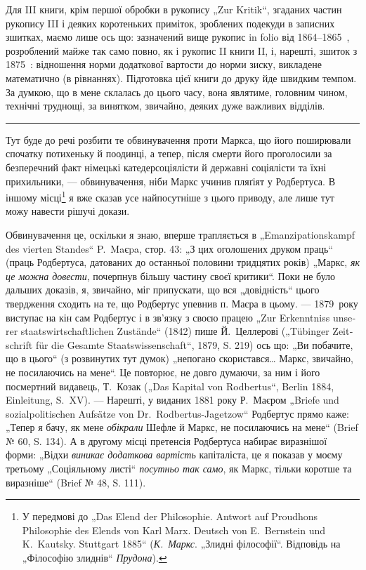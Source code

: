 Для III книги, крім першої обробки в рукопису „Zur Kritik“, згаданих
частин рукопису III і деяких коротеньких приміток, зроблених подекуди
в записних зшитках, маємо лише ось що: зазначений вище рукопис
in folio від 1864--1865~, розроблений майже так само повно, як
і рукопис II книги II, і, нарешті, зшиток з 1875~: відношення норми
додаткової вартости до норми зиску, викладене математично (в рівнаннях).
Підготовка цієї книги до друку йде швидким темпом. За думкою,
що в мене склалась до цього часу, вона являтиме, головним чином, технічні
труднощі, за винятком, звичайно, деяких дуже важливих відділів.

\pfbreak{}

\vspace*{\fill}
Тут буде до речі розбити те обвинувачення проти Маркса, що його
поширювали спочатку потихеньку й поодинці, а тепер, після смерти його
проголосили за безперечний факт німецькі катедерсоціялісти й державні
соціялісти та їхні прихильники, — обвинувачення, ніби Маркс учинив
пляґіят у Родбертуса. В іншому місці\footnote{
У передмові до „Das Elend der Philosophie. Antwort auf Proudhons Philosophie
des Elends von Karl Marx. Deutsch von E.~Bernstein und K.~Kautsky.
Stuttgart 1885“ (\emph{К.~Маркс}. „Злидні філософії“. Відповідь на „Філософію злиднів“
\emph{Прудона}).
} я вже сказав усе найпосутніше
з цього приводу, але лише тут можу навести рішучі докази.

Обвинувачення це, оскільки я знаю, вперше трапляється в „\textgerman{Emanzipationskampf
des vierten Standes}“ P.~Maєpa, стор. 43: „З цих оголошених
друком праць“ (праць Родбертуса, датованих до останньої половини
тридцятих років) „Маркс, \emph{як це можна довести}, почерпнув більшу частину
своєї критики“. Поки не було дальших доказів, я, звичайно, міг
припускати, що вся „довідність“ цього твердження сходить на те, що
Родбертус упевнив п. Маєра в цьому. — 1879~року виступає на кін сам Родбертус
і в зв’язку з своєю працею „\textgerman{Zur Erkenntniss unserer staatswirtschaftlichen
Zustände}“ (1842) пише Й.~Целлерові („\textgerman{Tübinger Zeitschrift für
die Gesamte Staatswissenschaft}“, 1879, S. 219) ось що: „Ви побачите, що
в цього“ (з розвинутих тут думок) „непогано скористався\dots{} Маркс, звичайно,
не посилаючись на мене“. Це повторює, не довго думаючи, за ним
і його посмертний видавець, Т.~Козак („Das Kapital von Rodbertus“, Berlin
1884, Einleitung, S.~XV). — Нарешті, у виданих 1881 року Р.~Маєром
„Briefe und sozialpolitischen Aufsätze von Dr.~Rodbertus-Jagetzow“ Родбертус
прямо каже: „Тепер я бачу, як мене \emph{обікрали} Шефле й Маркс, не
посилаючись на мене“ (Brief № 60, S. 134). А в другому місці претенсія
Родбертуса набирає виразнішої форми: „Відхи \emph{виникає додаткова
вартість} капіталіста, це я показав у моєму третьому „Соціяльному листі“
\emph{посутньо так само}, як Маркс, тільки коротше та виразніше“ (Brief
№ 48, S. 111).

